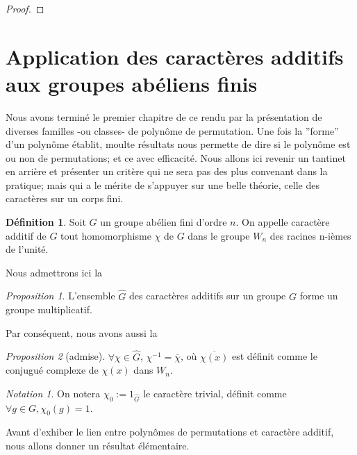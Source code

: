 \documentclass[12pt]{article}
\theoremstyle{remark}\newtheorem{note}{Note}
\theoremstyle{remark}\newtheorem{nota}{Notation}
\newtheorem{prop}{Proposition}
\theoremstyle{definition}
\newtheorem{definition}{Définition}
\begin{document}
\begin{proof}

\end{proof}
\section{Application des caractères additifs aux groupes abéliens finis}

Nous avons terminé le premier chapitre de ce rendu par la présentation de diverses familles -ou classes- de polynôme de permutation. Une fois la ''forme'' d'un polynôme établit, moulte résultats nous permette de dire si le polynôme est ou non de permutations; et ce avec efficacité. \newline
Nous allons ici revenir un tantinet en arrière et présenter un critère qui ne sera pas des plus convenant dans la pratique; mais qui a le mérite de s'appuyer sur une belle théorie, celle des caractères sur un corps fini.

\begin{definition}
Soit $G$ un groupe abélien fini d'ordre $n$. On appelle caractère additif de $G$ tout homomorphisme $\chi$ de $G$ dans le groupe $W_n$ des racines n-ièmes de l'unité.
\end{definition}

Nous admettrons ici la 

\begin{prop}
L'ensemble $\hat{G}$ des caractères additifs sur un groupe $G$ forme un groupe multiplicatif.
\end{prop}

Par conséquent, nous avons aussi la 

\begin{prop}[admise]
$\forall \chi \in \hat{G}$, $\chi^{-1} = \overline{\chi}$, où $\overline{\chi(x)}$ est définit comme le conjugué complexe de $\chi(x)$ dans $W_n$.
\end{prop}

\begin{nota}
On notera $ \chi_0 := 1_{\hat{G}}$  le caractère trivial, définit comme $\forall g \in G, \chi_0(g) = 1$.
\end{nota}

Avant d'exhiber le lien entre polynômes de permutations et caractère additif, nous allons donner un résultat élémentaire.
\end{document}

